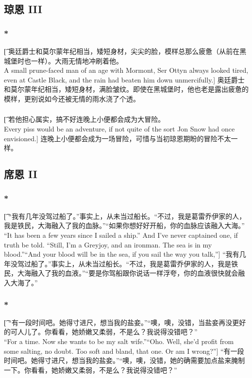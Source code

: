 \documentclass[12pt,a4paper]{article}
\begin{document}
\subsection{琼恩 III}
\subsubsection{\color{red}*}\t[
	奥廷爵士和莫尔蒙年纪相当，矮短身材，尖尖的脸，模样总那么疲惫（从前在黑城堡时也一样）。大雨无情地冲刷着他。\\
	A small prune-faced man of an age with Mormont, Ser Ottyn always looked tired, even at Castle Black, and the rain had beaten him down unmercifully.]
	奥廷爵士和莫尔蒙年纪相当，矮短身材，满脸皱纹。即使在黑城堡时，他也老是露出疲惫的模样，更别说如今还被无情的雨水浇了个透。

\subsubsection{}\t[
	若他担心属实，搞不好连晚上小便都会成为大冒险。\\
	Every piss would be an adventure, if not quite of the sort Jon Snow had once envisioned.]
	连晚上小便都会成为一场冒险，可惜与当初琼恩期盼的冒险不太一样。
	
\subsection{席恩 II}
\subsubsection{\color{red}*}\t[
	“我有几年没驾过船了。”事实上，从未当过船长。“不过，我是葛雷乔伊家的人，我是铁民，大海融入了我的血脉。”“如果你想好好开船，你的血脉应该融入大海。”\\
	“It has been a few years since I sailed a ship.” And I've never captained one, if truth be told. “Still, I'm a Greyjoy, and an ironman. The sea is in my blood.”“And your blood will be in the sea, if you sail the way you talk,”]
	“我有几年没驾过船了。”事实上，从未当过船长。“不过，我是葛雷乔伊家的人，我是铁民，大海融入了我的血液。”“要是你驾船跟你说话一样浮夸，你的血液很快就会融入大海了。”
	
\subsubsection{\color{red}*}\t[
	 “有一段时间吧。她得寸进尺，想当我的盐妾。”“噢，噢，没错，当盐妾再没更好的可人儿了。你看看，她娇嫩又柔弱，不是么？我说得没错吧？”\\
	 “For a time. Now she wants to be my salt wife.”“Oho. Well, she'd profit from some salting, no doubt. Too soft and bland, that one. Or am I wrong?”]
	 “有一段时间吧。她得寸进尺，想当我的盐妾。”“噢，噢，没错，她的确需要加点盐来腌制一下。你看看，她娇嫩又柔弱，不是么？我说得没错吧？”
\end{document}
